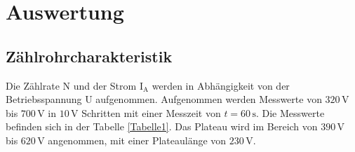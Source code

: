 \section{Auswertung} 

\subsection{Zählrohrcharakteristik}

\begin{flushleft}
    Die Zählrate N und der Strom $\text{I}_{\text{A}}$ werden in Abhängigkeit von der Betriebsspannung U aufgenommen. 
    Aufgenommen werden Messwerte von $320\,\unit{\volt}$ bis $700\,\unit{\volt}$ in $10\,\unit{\volt}$ Schritten mit einer Messzeit von $t = 60\,\unit{\second}$.
    Die Messwerte befinden sich in der Tabelle \ref{Tabelle1}.
    Das Plateau wird im Bereich von $390\,\unit{\volt}$ bis $620\,\unit{\volt}$ angenommen, mit einer Plateaulänge von $230\,\unit{\volt}$.
\end{flushleft}

